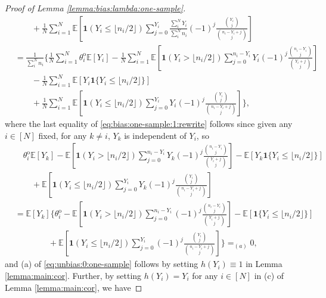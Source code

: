 \documentclass[12pt,letterpaper]{article}
\begin{document}
\begin{proof}[Proof of Lemma \ref{lemma:bias:lambda:one-sample}]
\begin{equation}
\begin{array}{rl}
&\displaystyle\quad\quad+\frac{1}{N}\sum_{i=1}^N\mathbb{E}\left[\mathbf{1}(Y_{i}\leq \lfloor n_i/2\rfloor)\sum_{j=0}^{Y_{i}}\frac{\sum_{i}^{N}Y_i}{\sum_{i}^{N}n_i}(-1)^{j}\frac{\binom{Y_i}{j}}{\binom{n_i-Y_i+j}{j}}\right]\\
&\displaystyle=\frac{1}{\sum_{i}^{N}n_i}\Bigg\{\frac{1}{N}\sum_{i=1}^N\theta_i^{\mathrm{o}}\mathbb{E}\left[Y_i\right]-\frac{1}{N}\sum_{i=1}^N\mathbb{E}\left[\mathbf{1}(Y_{i} > \lfloor n_i/2\rfloor)\!\!\!\sum_{j=0}^{n_{i}-Y_{i}}Y_i(-1)^{j}\frac{\binom{n_i-Y_i}{j}}{\binom{Y_i+j}{j}}\right]\\
&\displaystyle\quad\quad-\frac{1}{N}\sum_{i=1}^N\mathbb{E}\left[Y_i\mathbf{1}\{Y_i\leq \lfloor n_i/2\rfloor\}\right]\\
&\displaystyle\quad\quad+\frac{1}{N}\sum_{i=1}^N\mathbb{E}\left[\mathbf{1}(Y_{i}\leq \lfloor n_i/2\rfloor)\sum_{j=0}^{Y_{i}}Y_i(-1)^{j}\frac{\binom{Y_i}{j}}{\binom{n_i-Y_i+j}{j}}\right]\Bigg\},
\end{array}
\end{equation}
where the last equality of \eqref{eq:bias:one-sample:1:rewrite} follows since given any $i\in[N]$ fixed, for any $k\neq i$, $Y_k$ is independent of $Y_i$, so 
\begin{equation}\label{eq:unbias:0:one-sample}
\begin{array}{rl}
&\displaystyle\quad\theta_i^{\mathrm{o}}\mathbb{E}\left[Y_k\right]-\mathbb{E}\left[\mathbf{1}(Y_{i} > \lfloor n_i/2\rfloor)\!\!\!\sum_{j=0}^{n_{i}-Y_{i}}Y_k(-1)^{j}\frac{\binom{n_i-Y_i}{j}}{\binom{Y_i+j}{j}}\right]-\mathbb{E}\left[Y_k\mathbf{1}\{Y_i\leq \lfloor n_i/2\rfloor\}\right]\\
&\displaystyle\quad\quad+\mathbb{E}\left[\mathbf{1}(Y_{i}\leq \lfloor n_i/2\rfloor)\sum_{j=0}^{Y_{i}}Y_k(-1)^{j}\frac{\binom{Y_i}{j}}{\binom{n_i-Y_i+j}{j}}\right]\\
&\displaystyle=\mathbb{E}[Y_k]\Bigg\{\theta_i^{\mathrm{o}}-\mathbb{E}\left[\mathbf{1}(Y_{i} > \lfloor n_i/2\rfloor)\!\!\!\sum_{j=0}^{n_{i}-Y_{i}}(-1)^{j}\frac{\binom{n_i-Y_i}{j}}{\binom{Y_i+j}{j}}\right]-\mathbb{E}[\mathbf{1}\{Y_i\leq\lfloor n_i/2\rfloor\}]\\
&\displaystyle\quad\quad\quad\quad+\mathbb{E}\left[\mathbf{1}(Y_{i}\leq \lfloor n_i/2\rfloor)\sum_{j=0}^{Y_{i}}(-1)^{j}\frac{\binom{Y_i}{j}}{\binom{n_i-Y_i+j}{j}}\right]\Bigg\}=_{(a)}0,
\end{array}
\end{equation}
and (a) of \eqref{eq:unbias:0:one-sample} follows by setting $h(Y_i)\equiv1$ in Lemma \ref{lemma:main:cor}. Further, by setting $h(Y_i)=Y_i$ for any $i\in[N]$ in (c) of Lemma \ref{lemma:main:cor}, we have 

\end{proof}
\end{document}
